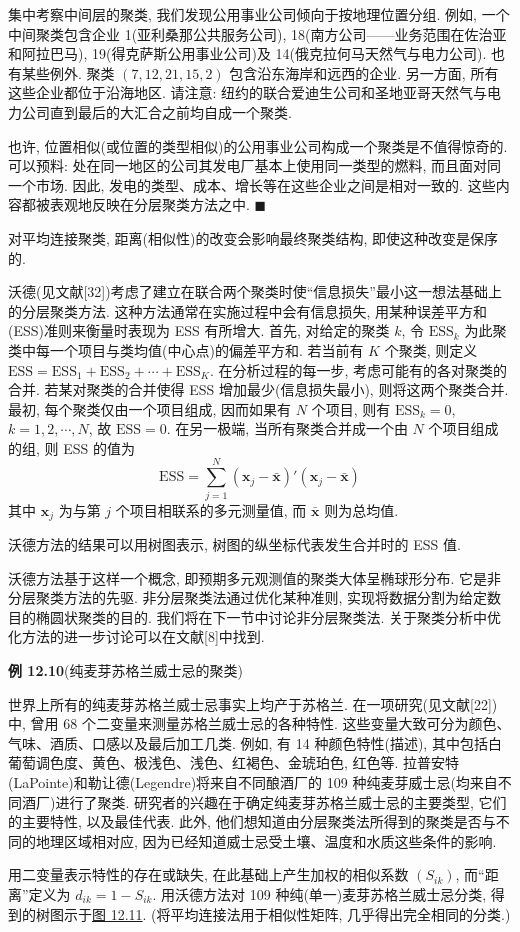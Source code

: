 
集中考察中间层的聚类, 我们发现公用事业公司倾向于按地理位置分组. 例如, 一个中间聚类包含企业 1(亚利桑那公共服务公司), 18(南方公司——业务范围在佐治亚和阿拉巴马), 19(得克萨斯公用事业公司)及 14(俄克拉何马天然气与电力公司). 也有某些例外. 聚类 $(7,12,21,15,2)$ 包含沿东海岸和远西的企业. 另一方面, 所有这些企业都位于沿海地区. 请注意: 纽约的联合爱迪生公司和圣地亚哥天然气与电力公司直到最后的大汇合之前均自成一个聚类.

也许, 位置相似(或位置的类型相似)的公用事业公司构成一个聚类是不值得惊奇的. 可以预料: 处在同一地区的公司其发电厂基本上使用同一类型的燃料, 而且面对同一个市场. 因此, 发电的类型、成本、增长等在这些企业之间是相对一致的. 这些内容都被表观地反映在分层聚类方法之中. \hfill$\blacksquare$

\noindent 对平均连接聚类, 距离(相似性)的改变会影响最终聚类结构, 即使这种改变是保序的.


沃德(见文献[32])考虑了建立在联合两个聚类时使“信息损失”最小这一想法基础上的分层聚类方法.
这种方法通常在实施过程中会有信息损失, 用某种误差平方和(ESS)准则来衡量时表现为 ESS 有所增大.
首先, 对给定的聚类 $k$, 令 $\mathrm{ESS}_k$ 为此聚类中每一个项目与类均值(中心点)的偏差平方和.
若当前有 $K$ 个聚类, 则定义 $\mathrm{ESS}=\mathrm{ESS}_1+\mathrm{ESS}_2+\cdots+\mathrm{ESS}_K$. 在分析过程的每一步, 考虑可能有的各对聚类的合并.
若某对聚类的合并使得 ESS 增加最少(信息损失最小), 则将这两个聚类合并.
最初, 每个聚类仅由一个项目组成, 因而如果有 $N$ 个项目, 则有 $\mathrm{ESS}_k=0$, $k=1,2,\cdots,N$, 故 $\mathrm{ESS}=0$.
在另一极端, 当所有聚类合并成一个由 $N$ 个项目组成的组, 则 ESS 的值为
\[
\mathrm{ESS}=\sum_{j=1}^{N}(\mathbf{x}_j-\bar{\mathbf{x}}) '(\mathbf{x}_j-\bar{\mathbf{x}})
\]
其中 $\mathbf{x}_j$ 为与第 $j$ 个项目相联系的多元测量值, 而 $\bar{\mathbf{x}}$ 则为总均值.

沃德方法的结果可以用树图表示, 树图的纵坐标代表发生合并时的 ESS 值.

沃德方法基于这样一个概念, 即预期多元观测值的聚类大体呈椭球形分布. 它是非分层聚类方法的先驱.
非分层聚类法通过优化某种准则, 实现将数据分割为给定数目的椭圆状聚类的目的.
我们将在下一节中讨论非分层聚类法. 关于聚类分析中优化方法的进一步讨论可以在文献[8]中找到.

\noindent\textbf{例 12.10}\quad (纯麦芽苏格兰威士忌的聚类)

世界上所有的纯麦芽苏格兰威士忌事实上均产于苏格兰. 在一项研究(见文献[22])中, 曾用 68 个二变量来测量苏格兰威士忌的各种特性.
这些变量大致可分为颜色、气味、酒质、口感以及最后加工几类. 例如, 有 14 种颜色特性(描述), 其中包括白葡萄调色度、黄色、极浅色、浅色、红褐色、金琥珀色, 红色等.
拉普安特(LaPointe)和勒让德(Legendre)将来自不同酿酒厂的 109 种纯麦芽威士忌(均来自不同酒厂)进行了聚类.
研究者的兴趣在于确定纯麦芽苏格兰威士忌的主要类型, 它们的主要特性, 以及最佳代表.
此外, 他们想知道由分层聚类法所得到的聚类是否与不同的地理区域相对应, 因为已经知道威士忌受土壤、温度和水质这些条件的影响.

用二变量表示特性的存在或缺失, 在此基础上产生加权的相似系数 $(S_{ik})$, 而“距离”定义为 $d_{ik}=1-S_{ik}$.
用沃德方法对 109 种纯(单一)麦芽苏格兰威士忌分类, 得到的树图示于\hyperref[fig:12.11]{图 12.11}. (将平均连接法用于相似性矩阵, 几乎得出完全相同的分类.)
